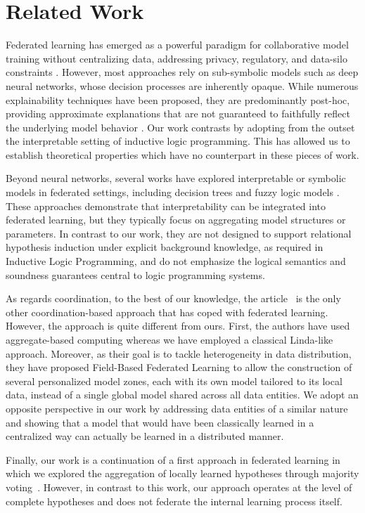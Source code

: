 \section{Related Work}
\label{sect-related-work}

Federated learning has emerged as a powerful paradigm for collaborative model training without centralizing data, addressing privacy, regulatory, and data-silo constraints \cite{li2021survey,yang2019federated}.
However, most approaches rely on sub-symbolic models such as deep neural networks, whose decision processes are inherently opaque. While numerous explainability techniques have been proposed, they are predominantly post-hoc, providing approximate explanations that are not guaranteed to faithfully reflect the underlying model behavior \cite{lopez2024interplay}.
Our work contrasts by adopting from the outset the interpretable setting of inductive logic programming. This has allowed us to establish theoretical properties which have no counterpart in these pieces of work.

Beyond neural networks, several works have explored interpretable or symbolic models in federated settings, including decision trees \cite{wu2021fedforest,li2023fedtree,truex2019hybrid} and fuzzy logic models \cite{ducange2024federated,jiang2025fuzzy,polap2021fuzzy,srivastava2025iot,wilbik2021towards}.
These approaches demonstrate that interpretability can be integrated into federated learning, but they typically focus on aggregating model structures or parameters. In contrast to our work, they are not designed to support relational hypothesis induction under explicit background knowledge, as required in Inductive Logic Programming, and do not emphasize the logical semantics and soundness guarantees central to logic programming systems.

As regards coordination, to the best of our knowledge, the article~\cite{Viroli-coord24} is the only other coordination-based approach that has coped with federated learning. However, the approach is quite different from ours. First, the authors have used aggregate-based computing whereas we have employed a classical Linda-like approach. Moreover, as their goal is to tackle heterogeneity in data distribution, they have proposed Field-Based Federated Learning to allow the construction of several personalized model zones, each with its own model tailored to its local data, instead of a single global model shared across all data entities. We adopt an opposite perspective in our work by addressing data entities of a similar nature and showing that a model that would have been classically learned in a centralized way can actually be learned in a distributed manner.

Finally, our work is a continuation of a first approach in federated learning in which we explored the aggregation of locally learned hypotheses through majority voting~\cite{akaichi2025federated}. However, in contrast to this work, our approach operates at the level of complete hypotheses and does not federate the internal learning process itself.
